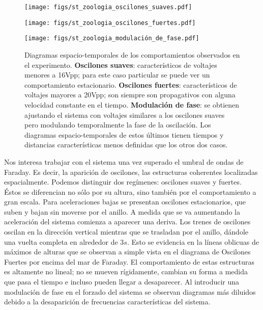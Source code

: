 \documentclass[../main.tex]{subfiles}
\begin{document}
\begin{figure}[H]
	\begin{minipage}{0.30\textwidth}
		\texttt{[image: figs/st\_zoologia\_oscilones\_suaves.pdf]}
	\end{minipage} \hfill
	\begin{minipage}{0.30\textwidth}
		\texttt{[image: figs/st\_zoologia\_oscilones\_fuertes.pdf]}
	\end{minipage} \hfill
	\begin{minipage}{0.30\textwidth}
		\texttt{[image: figs/st\_zoologia\_modulación\_de\_fase.pdf]}
	\end{minipage}
    \caption{Diagramas espacio-temporales de los comportamientos observados en el experimento. \textbf{Oscilones suaves}: característicos de voltajes menores a 16\si{Vpp}; para este caso particular se puede ver un comportamiento estacionario. \textbf{Oscilones fuertes}: característicos de voltajes mayores a 20\si{Vpp}; son siempre son propagativos con alguna velocidad constante en el tiempo. \textbf{Modulación de fase}: se obtienen ajustando el sistema con voltajes similares a los oscilones suaves pero modulando temporalmente la fase de la oscilación. Los diagramas espacio-temporales de estos últimos tienen tiempos y distancias características menos definidas que los otros dos casos.}
    \label{fig:zoologia}
\end{figure}

Nos interesa trabajar con el sistema una vez superado el umbral de ondas de Faraday. Es decir, la aparición de oscilones, las estructuras coherentes localizadas espacialmente. Podemos distinguir dos regímenes: oscilones suaves y fuertes. Éstos se diferencian no sólo por su altura, sino también por el comportamiento a gran escala. Para aceleraciones bajas se presentan oscilones estacionarios, que suben y bajan sin moverse por el anillo. A medida que se va aumentando la aceleración del sistema comienza a aparecer una deriva. Los trenes de oscilones oscilan en la dirección vertical mientras que se trasladan por el anillo, dándole una vuelta completa en alrededor de $3 \si{s}$. Esto se evidencia en la líneas oblicuas de máximos de alturas que se observan a simple vista en el diagrama de Oscilones Fuertes por encima del mar de Faraday. El comportamiento de estas estructuras es altamente no lineal; no se mueven rígidamente, cambian su forma a medida que pasa el tiempo e incluso pueden llegar a desaparecer. 
Al introducir una modulación de fase en el forzado del sistema se observan diagramas más diluidos debido a la desaparición de frecuencias características del sistema. 
\end{document}
